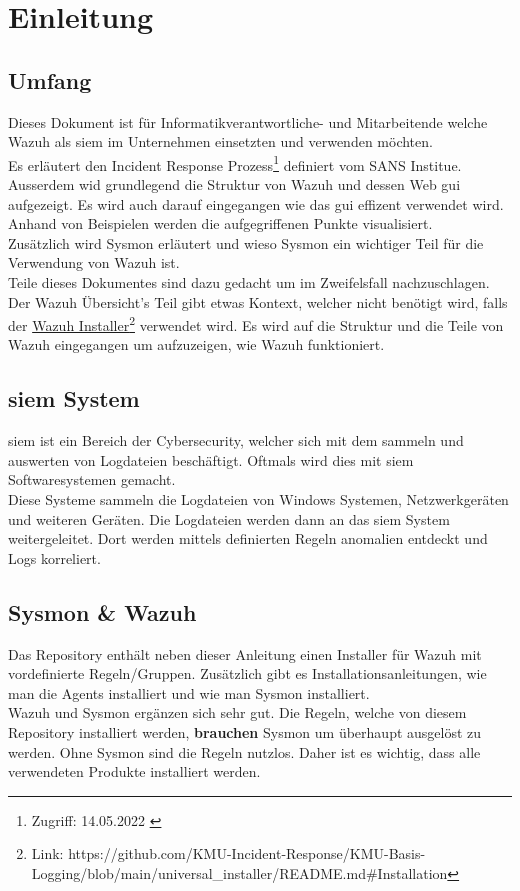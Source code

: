 \chapter{Einleitung}

\section{Umfang}
Dieses Dokument ist für Informatikverantwortliche- und Mitarbeitende welche Wazuh als \acrshort{siem} im Unternehmen einsetzten und verwenden möchten.\\

Es erläutert den Incident Response Prozess\footnote{Zugriff: 14.05.2022 \cite{sans-incident-handler-handbook}} definiert vom SANS Institue. 
Ausserdem wid grundlegend die Struktur von Wazuh und dessen Web \acrshort{gui} aufgezeigt.
Es wird auch darauf eingegangen wie das \acrshort{gui} effizent verwendet wird.
Anhand von Beispielen werden die aufgegriffenen Punkte visualisiert.\\

Zusätzlich wird Sysmon erläutert und wieso Sysmon ein wichtiger Teil für die Verwendung von Wazuh ist.\\

Teile dieses Dokumentes sind dazu gedacht um im Zweifelsfall nachzuschlagen.
Der Wazuh Übersicht's Teil gibt etwas Kontext, welcher nicht benötigt wird, falls der \href{https://github.com/KMU-Incident-Response/KMU-Basis-Logging/blob/main/universal\_installer/README.md\#Installation}{Wazuh Installer}\footnote{Link: https://github.com/KMU-Incident-Response/KMU-Basis-Logging/blob/main/universal\_installer/README.md\#Installation} verwendet wird.
Es wird auf die Struktur und die Teile von Wazuh eingegangen um aufzuzeigen, wie Wazuh funktioniert.  


\section{\acrshort{siem} System}
\acrfull{siem} ist ein Bereich der Cybersecurity, welcher sich mit dem sammeln und auswerten von Logdateien beschäftigt.
Oftmals wird dies mit \acrshort{siem} Softwaresystemen gemacht.\\

Diese Systeme sammeln die Logdateien von Windows Systemen, Netzwerkgeräten und weiteren Geräten.
Die Logdateien werden dann an das \acrshort{siem} System weitergeleitet.
Dort werden mittels definierten Regeln anomalien entdeckt und Logs korreliert.

\section{Sysmon \& Wazuh}
Das Repository enthält neben dieser Anleitung einen Installer für Wazuh mit vordefinierte Regeln/Gruppen.
Zusätzlich gibt es Installationsanleitungen, wie man die Agents installiert und wie man Sysmon installiert.\\

Wazuh und Sysmon ergänzen sich sehr gut.
Die Regeln, welche von diesem Repository installiert werden, \textbf{brauchen} Sysmon um überhaupt ausgelöst zu werden.
Ohne Sysmon sind die Regeln nutzlos. 
Daher ist es wichtig, dass alle verwendeten Produkte installiert werden.